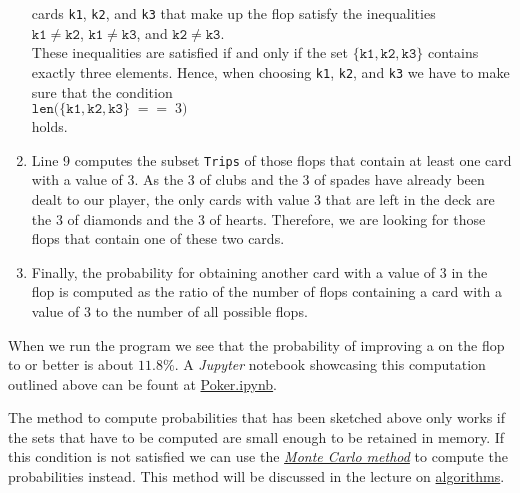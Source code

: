 \begin{enumerate}
      cards \texttt{k1}, \texttt{k2}, and \texttt{k3} that make up the flop satisfy the inequalities 
      \\[0.2cm]
      \hspace*{1.3cm}
      $\mathtt{k1} \not= \mathtt{k2}$, \quad $\mathtt{k1} \not= \mathtt{k3}$,  \quad and \quad $\mathtt{k2} \not= \mathtt{k3}$.
      \\[0.2cm]
      These inequalities are satisfied if and only if the set 
      $\{ \mathtt{k1}, \mathtt{k2}, \mathtt{k3} \}$ contains exactly three elements.  Hence, when
      choosing \texttt{k1}, \texttt{k2}, and \texttt{k3} we have to make sure that the condition
      \\[0.2cm]
      \hspace*{1.3cm}
      $\texttt{len}\bigl({\{ \mathtt{k1}, \mathtt{k2}, \mathtt{k3} \} \;\mathtt{==}\; 3 }\bigr)$
      \\[0.2cm]
      holds.
\item Line 9 computes the subset \texttt{Trips} of those flops that contain at least one card with a value of 3.
      As the 3 of clubs and the 3 of spades have already been dealt to our player, the only cards
      with value 3 that are left in the deck are the 3 of diamonds and the 3 of hearts.  Therefore, we are looking for
      those flops that contain one of these two cards.
\item Finally, the probability for obtaining another card with a value of 3 in the flop is computed as
      the ratio of the number of flops containing a card with a value of 3 to the number of all possible flops.
\end{enumerate}
When we run the program we see that the probability of improving a  on the flop to  or better
is about  $11.8\%$.  A \textsl{Jupyter} notebook showcasing this computation outlined above can be fount at
\href{https://github.com/karlstroetmann/Logic/blob/master/Python/Poker.ipynb}{Poker.ipynb}.

\remarkEng
The method to compute probabilities that has been sketched above only works if the sets that have to
be computed are small enough to be retained in memory.  If this condition is
not satisfied we can use the \href{https://en.wikipedia.org/wiki/Monte_Carlo_method}{\emph{Monte Carlo method}} 
to compute the probabilities instead.  This method will be discussed in the lecture on 
\href{https://github.com/karlstroetmann/Algorithms/blob/master/Lecture-Notes/algorithms.pdf}{algorithms}.


